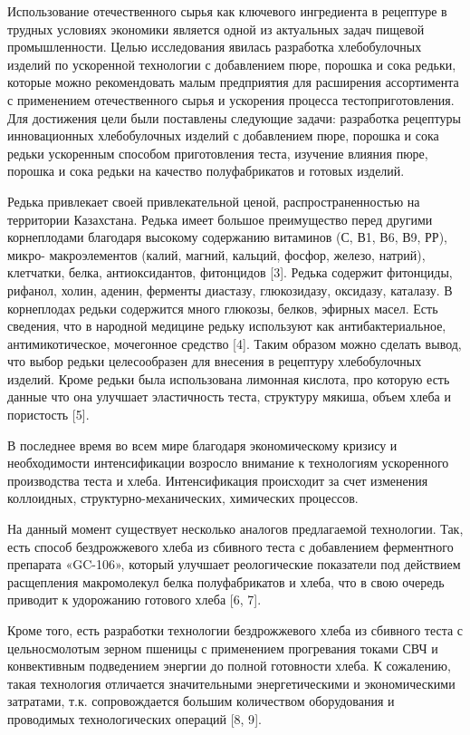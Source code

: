Использование отечественного сырья как ключевого ингредиента в рецептуре
в трудных условиях экономики является одной из актуальных задач пищевой
промышленности. Целью исследования явилась разработка хлебобулочных
изделий по ускоренной технологии с добавлением пюре, порошка и сока
редьки, которые можно рекомендовать малым предприятия для расширения
ассортимента с применением отечественного сырья и ускорения процесса
тестоприготовления. Для достижения цели были поставлены следующие
задачи: разработка рецептуры инновационных хлебобулочных изделий с
добавлением пюре, порошка и сока редьки ускоренным способом
приготовления теста, изучение влияния пюре, порошка и сока редьки на
качество полуфабрикатов и готовых изделий.

Редька привлекает своей привлекательной ценой, распространенностью на
территории Казахстана. Редька имеет большое преимущество перед другими
корнеплодами благодаря высокому содержанию витаминов (С, В1, В6, В9,
РР), микро- макроэлементов (калий, магний, кальций, фосфор, железо,
натрий), клетчатки, белка, антиоксидантов, фитонцидов {[}3{]}. Редька
содержит фитонциды, рифанол, холин, аденин, ферменты диастазу,
глюкозидазу, оксидазу, каталазу. В корнеплодах редьки содержится много
глюкозы, белков, эфирных масел. Есть сведения, что в народной медицине
редьку используют как антибактериальное, антимикотическое, мочегонное
средство {[}4{]}. Таким образом можно сделать вывод, что выбор редьки
целесообразен для внесения в рецептуру хлебобулочных изделий. Кроме
редьки была использована лимонная кислота, про которую есть данные что
она улучшает эластичность теста, структуру мякиша, объем хлеба и
пористость {[}5{]}.

В последнее время во всем мире благодаря экономическому кризису и
необходимости интенсификации возросло внимание к технологиям ускоренного
производства теста и хлеба. Интенсификация происходит за счет изменения
коллоидных, структурно-механических, химических процессов.

На данный момент существует несколько аналогов предлагаемой технологии.
Так, есть способ бездрожжевого хлеба из сбивного теста с добавлением
ферментного препарата «GC-106», который улучшает реологические
показатели под действием расщепления макромолекул белка полуфабрикатов и
хлеба, что в свою очередь приводит к удорожанию готового хлеба {[}6,
7{]}.

Кроме того, есть разработки технологии бездрожжевого хлеба из сбивного
теста с цельносмолотым зерном пшеницы с применением прогревания токами
СВЧ и конвективным подведением энергии до полной готовности хлеба. К
сожалению, такая технология отличается значительными энергетическими и
экономическими затратами, т.к. сопровождается большим количеством
оборудования и проводимых технологических операций {[}8, 9{]}.


